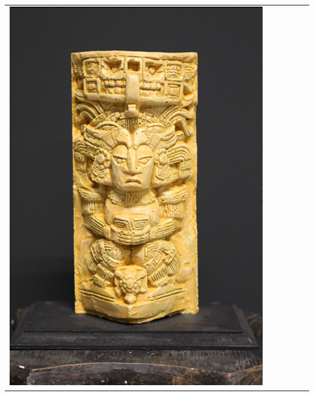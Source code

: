 \documentclass[final,12pt,3p]{elsarticle}
\begin{document}
\begin{table}
{\begin{tabular}{| c |  m{0.8cm} | m{0.8cm} | c | c | c |}
	\includegraphics[scale=0.05]{./images/aztec_real.png} & 

\end{tabular}}
\end{table}
\end{document}
